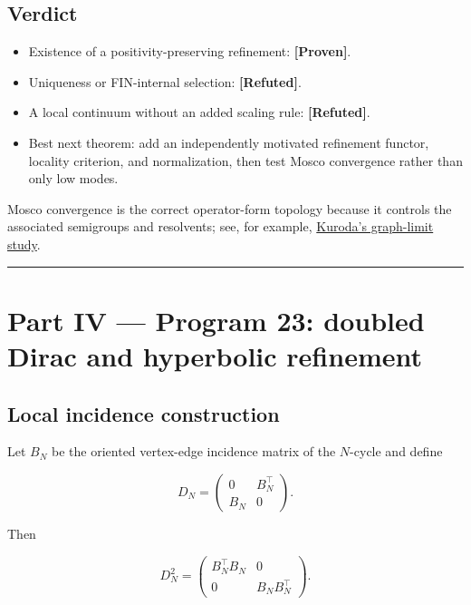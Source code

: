 \documentclass[11pt,a4paper,openany]{report}
\newcommand{\statusProven}{\textcolor{fingreen}{[Proven]}}
\newcommand{\statusRefuted}{\textcolor{finred}{[Refuted]}}
\begin{document}
\section{Verdict}

\begin{itemize}
\item 
Existence of a positivity-preserving refinement: \textbf{\statusProven{}}.

\item 
Uniqueness or FIN-internal selection: \textbf{\statusRefuted{}}.

\item 
A local continuum without an added scaling rule: \textbf{\statusRefuted{}}.

\item 
Best next theorem: add an independently motivated refinement functor, locality criterion, and normalization, then test Mosco convergence rather than only low modes.

\end{itemize}

Mosco convergence is the correct operator-form topology because it controls the associated semigroups and resolvents; see, for example, \href{https://arxiv.org/abs/1106.5476}{Kuroda's graph-limit study}.

\par\medskip\hrule\medskip

\chapter{Part IV — Program 23: doubled Dirac and hyperbolic refinement}

\section{Local incidence construction}

Let \(B_N\) be the oriented vertex-edge incidence matrix of the \(N\)-cycle and define

\[
D_N=
\begin{pmatrix}
0&B_N^\top\\
B_N&0
\end{pmatrix}.
\]

Then

\[
D_N^2=
\begin{pmatrix}
B_N^\top B_N&0\\
0&B_NB_N^\top
\end{pmatrix}.
\]
\end{document}
